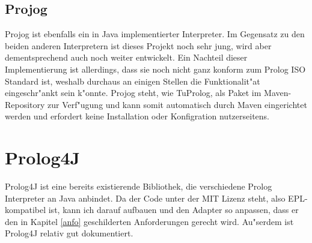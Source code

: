 \subsection{Projog}
Projog\cite{projog} ist ebenfalls ein in Java implementierter Interpreter. Im Gegensatz zu den beiden anderen Interpretern ist dieses Projekt noch sehr jung, wird aber dementsprechend auch noch weiter entwickelt. Ein Nachteil dieser Implementierung ist allerdings, dass sie noch nicht ganz konform zum Prolog ISO Standard ist, weshalb durchaus an einigen Stellen die Funktionalit"at eingeschr"ankt sein k"onnte. Projog steht, wie TuProlog, als Paket im Maven-Repository zur Verf"ugung und kann somit automatisch durch Maven eingerichtet werden und erfordert keine Installation oder Konfigration nutzerseitens.

\section{Prolog4J}
Prolog4J\cite{prolog4j} ist eine bereits existierende Bibliothek, die verschiedene Prolog Interpreter an Java anbindet. Da der Code unter der MIT Lizenz steht, also EPL-kompatibel ist, kann ich darauf aufbauen und den Adapter so anpassen, dass er den in Kapitel \ref{anfo} geschilderten Anforderungen gerecht wird. Au"serdem ist Prolog4J relativ gut dokumentiert\cite{prolog4jdoku}.

